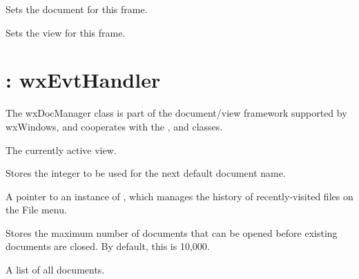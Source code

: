 

Sets the document for this frame.



Sets the view for this frame.



\section{: wxEvtHandler}\label{wxdocmanager}


The wxDocManager class is part of the document/view framework supported by wxWindows,
and cooperates with the , \rtfsp
and  classes.



The currently active view.



Stores the integer to be used for the next default document name.



A pointer to an instance of ,
which manages the history of recently-visited files on the File menu.



Stores the maximum number of documents that can be opened before
existing documents are closed. By default, this is 10,000.



A list of all documents.


